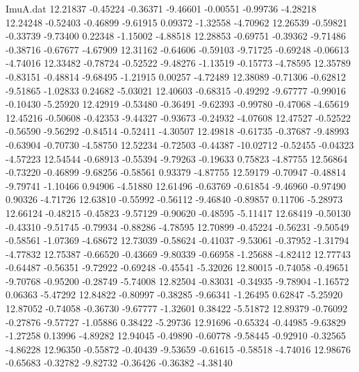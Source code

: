 \begin{filecontents}{ImuA.dat}
  12.21837   -0.45224   -0.36371   -9.46601   -0.00551   -0.99736   -4.28218
  12.24248   -0.52403   -0.46899   -9.61915    0.09372   -1.32558   -4.70962
  12.26539   -0.59821   -0.33739   -9.73400    0.22348   -1.15002   -4.88518
  12.28853   -0.69751   -0.39362   -9.71486   -0.38716   -0.67677   -4.67909
  12.31162   -0.64606   -0.59103   -9.71725   -0.69248   -0.06613   -4.74016
  12.33482   -0.78724   -0.52522   -9.48276   -1.13519   -0.15773   -4.78595
  12.35789   -0.83151   -0.48814   -9.68495   -1.21915    0.00257   -4.72489
  12.38089   -0.71306   -0.62812   -9.51865   -1.02833    0.24682   -5.03021
  12.40603   -0.68315   -0.49292   -9.67777   -0.99016   -0.10430   -5.25920
  12.42919   -0.53480   -0.36491   -9.62393   -0.99780   -0.47068   -4.65619
  12.45216   -0.50608   -0.42353   -9.44327   -0.93673   -0.24932   -4.07608
  12.47527   -0.52522   -0.56590   -9.56292   -0.84514   -0.52411   -4.30507
  12.49818   -0.61735   -0.37687   -9.48993   -0.63904   -0.70730   -4.58750
  12.52234   -0.72503   -0.44387  -10.02712   -0.52455   -0.04323   -4.57223
  12.54544   -0.68913   -0.55394   -9.79263   -0.19633    0.75823   -4.87755
  12.56864   -0.73220   -0.46899   -9.68256   -0.58561    0.93379   -4.87755
  12.59179   -0.70947   -0.48814   -9.79741   -1.10466    0.94906   -4.51880
  12.61496   -0.63769   -0.61854   -9.46960   -0.97490    0.90326   -4.71726
  12.63810   -0.55992   -0.56112   -9.46840   -0.89857    0.11706   -5.28973
  12.66124   -0.48215   -0.45823   -9.57129   -0.90620   -0.48595   -5.11417
  12.68419   -0.50130   -0.43310   -9.51745   -0.79934   -0.88286   -4.78595
  12.70899   -0.45224   -0.56231   -9.50549   -0.58561   -1.07369   -4.68672
  12.73039   -0.58624   -0.41037   -9.53061   -0.37952   -1.31794   -4.77832
  12.75387   -0.66520   -0.43669   -9.80339   -0.66958   -1.25688   -4.82412
  12.77743   -0.64487   -0.56351   -9.72922   -0.69248   -0.45541   -5.32026
  12.80015   -0.74058   -0.49651   -9.70768   -0.95200   -0.28749   -5.74008
  12.82504   -0.83031   -0.34935   -9.78904   -1.16572    0.06363   -5.47292
  12.84822   -0.80997   -0.38285   -9.66341   -1.26495    0.62847   -5.25920
  12.87052   -0.74058   -0.36730   -9.67777   -1.32601    0.38422   -5.51872
  12.89379   -0.76092   -0.27876   -9.57727   -1.05886    0.38422   -5.29736
  12.91696   -0.65324   -0.44985   -9.63829   -1.27258    0.13996   -4.89282
  12.94045   -0.49890   -0.60778   -9.58445   -0.92910   -0.32565   -4.86228
  12.96350   -0.55872   -0.40439   -9.53659   -0.61615   -0.58518   -4.74016
  12.98676   -0.65683   -0.32782   -9.82732   -0.36426   -0.36382   -4.38140

\end{filecontents}

